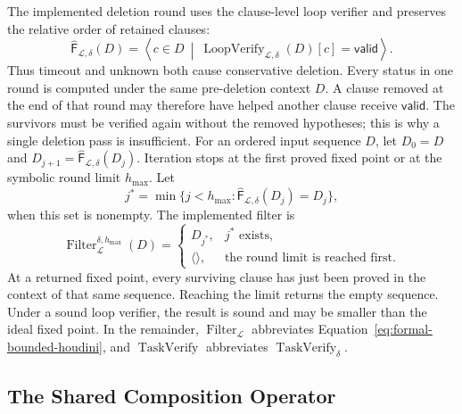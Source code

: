 The implemented deletion round uses the clause-level loop verifier and
preserves the relative order of retained clauses:
\begin{equation}
  \widehat{\mathsf F}_{\mathcal L,\delta}(D)
  =\left\langle c\in D\ \middle|\
    \operatorname{LoopVerify}_{\mathcal L,\delta}(D)[c]=\mathsf{valid}
  \right\rangle.
  \label{eq:formal-bounded-houdini-round}
\end{equation}
Thus timeout and unknown both cause conservative deletion.  Every status in
one round is computed under the same pre-deletion context \(D\).  A clause
removed at the end of that round may therefore have helped another clause
receive \(\mathsf{valid}\).  The survivors must be verified again without the
removed hypotheses; this is why a single deletion pass is insufficient.  For
an ordered input sequence \(D\), let \(D_0=D\) and
\(D_{j+1}=\widehat{\mathsf F}_{\mathcal L,\delta}(D_j)\).  Iteration stops at
the first proved fixed point or at the symbolic round limit \(h_{\max}\).  Let
\begin{equation}
  j^*=\min\{j<h_{\max}:
    \widehat{\mathsf F}_{\mathcal L,\delta}(D_j)=D_j\},
  \label{eq:formal-bounded-fixed-point}
\end{equation}
when this set is nonempty.  The implemented filter is
\begin{equation}
  \operatorname{Filter}_{\mathcal L}^{\delta,h_{\max}}(D)=
  \begin{cases}
    D_{j^*}, & j^*\text{ exists},\\
    \langle\rangle, & \text{the round limit is reached first}.
  \end{cases}
  \label{eq:formal-bounded-houdini}
\end{equation}
At a returned fixed point, every surviving clause has just been proved in the
context of that same sequence.  Reaching the limit returns the empty sequence.  Under a
sound loop verifier, the result is sound and may be smaller than the ideal
fixed point.  In
the remainder, \(\operatorname{Filter}_{\mathcal L}\) abbreviates
Equation~\eqref{eq:formal-bounded-houdini}, and
\(\operatorname{TaskVerify}\) abbreviates
\(\operatorname{TaskVerify}_{\delta}\).

\subsection{The Shared Composition Operator}

